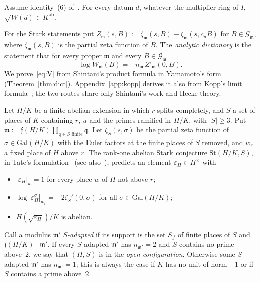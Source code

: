 \documentclass[11pt]{amsart}
\numberwithin{equation}{section}
\theoremstyle{plain}
\newenvironment{lthm}[1]{\renewcommand\thelthminner{#1}\lthminner}{\endlthminner}
\theoremstyle{definition}
\theoremstyle{remark}
\newcommand{\Kab}{K^{\mathrm{ab}}}
\newcommand{\Gal}{\mathrm{Gal}}
\begin{document}
\begin{lthm}{E}[Square roots]\label{thm:G}
Assume identity~(6) of~\cite{RW}. For every datum $d$, whatever the multiplier ring of $I$, $\sqrt{W(d)}\in\Kab$.
\end{lthm}

For the Stark statements put $Z_{\mathfrak m}(s,B):=\zeta_{\mathfrak m}(s,B)-\zeta_{\mathfrak m}(s,c_uB)$ for $B\in\mathcal G_{\mathfrak m}$, where $\zeta_{\mathfrak m}(s,B)$ is the partial zeta function of $B$. The \emph{analytic dictionary} is the statement that for every proper $\mathfrak m$ and every $B\in\mathcal G_{\mathfrak m}$
\begin{equation}\tag{V}\label{eq:V}
\log W_{\mathfrak m}(B)=-n_{\mathfrak m}\,Z'_{\mathfrak m}(0,B).
\end{equation}
We prove~\eqref{eq:V} from Shintani's product formula in Yamamoto's form (Theorem~\ref{thm:dict}). Appendix~\ref{app:kopp} derives it also from Kopp's limit formula~\cite[Thm.~1.1]{Ko}; the two routes share only Shintani's work and Hecke theory.

Let $H/K$ be a finite abelian extension in which $r$ splits completely, and $S$ a set of places of $K$ containing $r$, $u$ and the primes ramified in $H/K$, with $|S|\ge3$. Put $\mathfrak m:=\mathfrak f(H/K)\prod_{\mathfrak q\in S\text{ finite}}\mathfrak q$. Let $\zeta_S(s,\sigma)$ be the partial zeta function of $\sigma\in\Gal(H/K)$ with the Euler factors at the finite places of $S$ removed, and $w_r$ a fixed place of $H$ above $r$. The rank-one abelian Stark conjecture $\mathrm{St}(H/K,S)$, in Tate's formulation~\cite[Ch.~IV]{Ta} (see also~\cite{Ru}), predicts an element $\varepsilon_H\in H^\times$ with
\begin{itemize}
\item[(St1)] $|\varepsilon_H|_w=1$ for every place $w$ of $H$ not above $r$;
\item[(St2)] $\log|\varepsilon_H^\sigma|_{w_r}=-2\zeta_S'(0,\sigma)$ for all $\sigma\in\Gal(H/K)$;
\item[(St3)] $H(\sqrt{\varepsilon_H})/K$ is abelian.
\end{itemize}
Call a modulus $\mathfrak m'$ \emph{$S$-adapted} if its support is the set $S_f$ of finite places of $S$ and $\mathfrak f(H/K)\mid\mathfrak m'$. If every $S$-adapted $\mathfrak m'$ has $n_{\mathfrak m'}=2$ and $S$ contains no prime above~$2$, we say that $(H,S)$ is in the \emph{open configuration}. Otherwise some $S$-adapted $\mathfrak m'$ has $n_{\mathfrak m'}=1$; this is always the case if $K$ has no unit of norm $-1$ or if $S$ contains a prime above~$2$.
\end{document}
